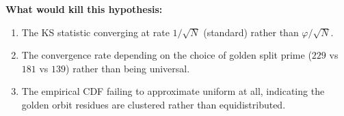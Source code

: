 \textbf{What would kill this hypothesis:}
\begin{enumerate}[noitemsep]
  \item The KS statistic converging at rate $1/\sqrt{N}$ (standard) rather than $\varphi/\sqrt{N}$.
  \item The convergence rate depending on the choice of golden split prime ($229$ vs $181$ vs $139$) rather than being universal.
  \item The empirical CDF failing to approximate uniform at all, indicating the golden orbit residues are clustered rather than equidistributed.
\end{enumerate}


